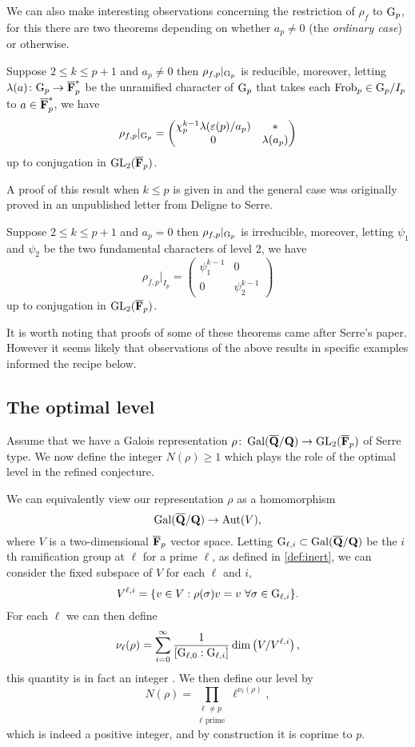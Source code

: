 \documentclass[a4paper,12pt]{article}
\begin{document}
We can also make interesting observations concerning the restriction of $\rho_f$ to $\mathrm{G}_p$, for this there are two theorems depending on whether $a_p \ne 0$ (the \emph{ordinary case}) or otherwise.

\begin{thm}[Deligne]
Suppose $2\le k\le p+1$ and $a_p \ne 0$ then $\rho_{f,p}|_{\mathrm{G}_p}$ is reducible, moreover, letting $\lambda(a)\colon \mathrm{G}_p \to \overline{\mathbf{F}}_p^*$ be the unramified character of $\mathrm{G}_p$ that takes each $\operatorname{Frob}_p \in \mathrm{G}_p /I_p$ to $a\in\overline{\mathbf{F}}_p^*$, we have
\[
\rho_{f,p}|_{\mathrm{G}_p} = \begin{pmatrix} \chi_p^{k-1}\lambda(\varepsilon(p)/a_p) & * \\ 0 & \lambda(a_p)\end{pmatrix}
\]
up to conjugation in $\operatorname{GL}_2(\overline{\mathbf{F}}_p)$.
\end{thm}

A proof of this result when $k \le p$ is given in \cite{Gross} and the general case was originally proved in an unpublished letter from Deligne to Serre.

\begin{thm}[Fontaine]
Suppose $2\le k \le p +1$ and $a_p = 0$ then $\rho_{f,p}|_{\mathrm{G}_p}$ is irreducible, moreover, letting $\psi_1$ and $\psi_2$ be the two fundamental characters of level 2, we have
\[
\rho_{f,p}|_{I_p} = \begin{pmatrix} \psi_1^{k-1} & 0 \\ 0 & \psi_2^{k-1}\end{pmatrix}
\]
up to conjugation in $\operatorname{GL}_2(\overline{\mathbf{F}}_p)$.
\end{thm}

It is worth noting that proofs of some of these theorems came after Serre's paper.
However it seems likely that observations of the above results in specific examples informed the recipe below.


\subsection{The optimal level}\label{subsec:level}
Assume that we have a Galois representation $\rho\colon \operatorname{Gal}(\overline{\mathbf{Q}}/\mathbf{Q}) \to \operatorname{GL}_2(\overline{\mathbf{F}}_p)$ of Serre type.
We now define the integer $N(\rho) \ge 1$ which plays the role of the optimal level in the refined conjecture.

We can equivalently view our representation $\rho$ as a homomorphism
\[
\operatorname{Gal}(\overline{\mathbf{Q}}/\mathbf{Q}) \to \operatorname{Aut}(V),
\]
where $V$ is a two-dimensional $\overline{\mathbf{F}}_p$ vector space.
Letting $\mathrm{G}_{\ell,i}\subset \operatorname{Gal}(\overline{\mathbf{Q}}/\mathbf{Q})$ be the $i$th ramification group at $\ell$ for a prime $\ell$, as defined in \cref{def:inert}, we can consider the fixed subspace of $V$ for each $\ell$ and $i$,
\[
V^{\ell,i} = \{v\in V : \rho(\sigma) v = v\ \forall \sigma \in \G_{\ell,i}\}.
\]
For each $\ell$ we can then define
\[
\nu_\ell(\rho) = \sum_{i = 0}^{\infty} \frac{1}{[\mathrm{G}_{\ell,0} : \mathrm{G}_{\ell,i}]} \dim\left(V/V^{\ell,i}\right),
\]
this quantity is in fact an integer \cite{}. %
We then define our level by
\[
N(\rho) = \prod_{\substack{\ell \ne p\\ \ell\text{ prime}}} \ell^{\nu_\ell(\rho)},
\]
which is indeed a positive integer, and by construction it is coprime to $p$.
\end{document}
